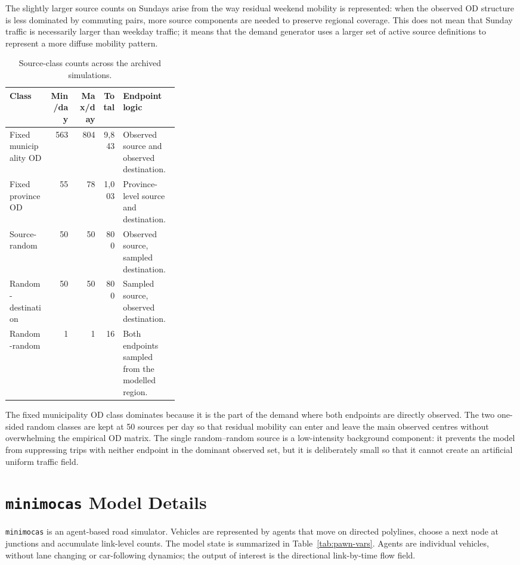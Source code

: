 \documentclass[11pt,a4paper]{article}
\newcommand{\modelname}{\texttt{minimocas}}
\begin{document}
The slightly larger source counts on Sundays arise from the way residual weekend mobility is represented: when the observed OD structure is less dominated by commuting pairs, more source components are needed to preserve regional coverage. This does not mean that Sunday traffic is necessarily larger than weekday traffic; it means that the demand generator uses a larger set of active source definitions to represent a more diffuse mobility pattern.

\begin{table}[htbp]
\centering
\caption{Source-class counts across the archived simulations.}
\label{tab:source-classes}
\begin{tabular}{@{}lrrrp{0.33\linewidth}@{}}
\toprule
Class & Min/day & Max/day & Total & Endpoint logic \\
\midrule
Fixed municipality OD & 563 & 804 & 9,843 & Observed source and observed
destination. \\
Fixed province OD & 55 & 78 & 1,003 & Province-level source and destination. \\
Source-random & 50 & 50 & 800 & Observed source, sampled destination. \\
Random-destination & 50 & 50 & 800 & Sampled source, observed destination. \\
Random-random & 1 & 1 & 16 & Both endpoints sampled from the modelled region. \\
\bottomrule
\end{tabular}
\end{table}

The fixed municipality OD class dominates because it is the part of the demand where both endpoints are directly observed. The two one-sided random classes are kept at 50 sources per day so that residual mobility can enter and leave the main observed centres without overwhelming the empirical OD matrix. The single random--random source is a low-intensity background component: it prevents the model from suppressing trips with neither endpoint in the dominant observed set, but it is deliberately small so that it cannot create an artificial uniform traffic field.

\section{\modelname{} Model Details}
\label{sec:model-details}

\modelname{} is an agent-based road simulator. Vehicles are represented by
agents that move on directed polylines, choose a next node at junctions and accumulate link-level counts. The model state is summarized in Table~\ref{tab:pawn-vars}. Agents are individual vehicles, without lane changing or car-following dynamics; the output of interest is the directional link-by-time flow field.
\end{document}
